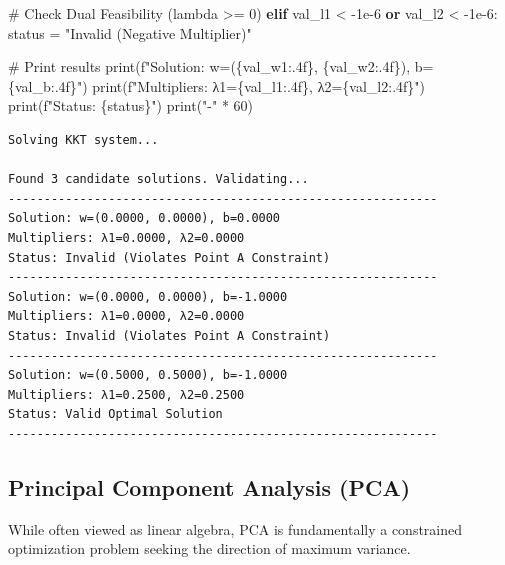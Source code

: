 \documentclass[
  letterpaper,
  DIV=11,
  numbers=noendperiod]{scrreprt}
\newenvironment{Shaded}{\begin{snugshade}}{\end{snugshade}}
\newcommand{\BuiltInTok}[1]{\textcolor[rgb]{0.00,0.23,0.31}{#1}}
\newcommand{\CommentTok}[1]{\textcolor[rgb]{0.37,0.37,0.37}{#1}}
\newcommand{\ControlFlowTok}[1]{\textcolor[rgb]{0.00,0.23,0.31}{\textbf{#1}}}
\newcommand{\DecValTok}[1]{\textcolor[rgb]{0.68,0.00,0.00}{#1}}
\newcommand{\FloatTok}[1]{\textcolor[rgb]{0.68,0.00,0.00}{#1}}
\newcommand{\KeywordTok}[1]{\textcolor[rgb]{0.00,0.23,0.31}{\textbf{#1}}}
\newcommand{\NormalTok}[1]{\textcolor[rgb]{0.00,0.23,0.31}{#1}}
\newcommand{\OperatorTok}[1]{\textcolor[rgb]{0.37,0.37,0.37}{#1}}
\newcommand{\SpecialCharTok}[1]{\textcolor[rgb]{0.37,0.37,0.37}{#1}}
\newcommand{\SpecialStringTok}[1]{\textcolor[rgb]{0.13,0.47,0.30}{#1}}
\newcommand{\StringTok}[1]{\textcolor[rgb]{0.13,0.47,0.30}{#1}}
\begin{document}
\begin{Shaded}
\begin{Highlighting}[]
    \CommentTok{\# Check Dual Feasibility (lambda \textgreater{}= 0)}
    \ControlFlowTok{elif}\NormalTok{ val\_l1 }\OperatorTok{\textless{}} \OperatorTok{{-}}\FloatTok{1e{-}6} \KeywordTok{or}\NormalTok{ val\_l2 }\OperatorTok{\textless{}} \OperatorTok{{-}}\FloatTok{1e{-}6}\NormalTok{:}
\NormalTok{        status }\OperatorTok{=} \StringTok{"Invalid (Negative Multiplier)"}

    \CommentTok{\# Print results}
    \BuiltInTok{print}\NormalTok{(}\SpecialStringTok{f"Solution: w=(}\SpecialCharTok{\{}\NormalTok{val\_w1}\SpecialCharTok{:.4f\}}\SpecialStringTok{, }\SpecialCharTok{\{}\NormalTok{val\_w2}\SpecialCharTok{:.4f\}}\SpecialStringTok{), b=}\SpecialCharTok{\{}\NormalTok{val\_b}\SpecialCharTok{:.4f\}}\SpecialStringTok{"}\NormalTok{)}
    \BuiltInTok{print}\NormalTok{(}\SpecialStringTok{f"Multipliers: λ1=}\SpecialCharTok{\{}\NormalTok{val\_l1}\SpecialCharTok{:.4f\}}\SpecialStringTok{, λ2=}\SpecialCharTok{\{}\NormalTok{val\_l2}\SpecialCharTok{:.4f\}}\SpecialStringTok{"}\NormalTok{)}
    \BuiltInTok{print}\NormalTok{(}\SpecialStringTok{f"Status: }\SpecialCharTok{\{}\NormalTok{status}\SpecialCharTok{\}}\SpecialStringTok{"}\NormalTok{)}
    \BuiltInTok{print}\NormalTok{(}\StringTok{"{-}"} \OperatorTok{*} \DecValTok{60}\NormalTok{)}
\end{Highlighting}
\end{Shaded}

\begin{verbatim}
Solving KKT system...

Found 3 candidate solutions. Validating...
------------------------------------------------------------
Solution: w=(0.0000, 0.0000), b=0.0000
Multipliers: λ1=0.0000, λ2=0.0000
Status: Invalid (Violates Point A Constraint)
------------------------------------------------------------
Solution: w=(0.0000, 0.0000), b=-1.0000
Multipliers: λ1=0.0000, λ2=0.0000
Status: Invalid (Violates Point A Constraint)
------------------------------------------------------------
Solution: w=(0.5000, 0.5000), b=-1.0000
Multipliers: λ1=0.2500, λ2=0.2500
Status: Valid Optimal Solution
------------------------------------------------------------
\end{verbatim}

\subsection{Principal Component Analysis
(PCA)}\label{principal-component-analysis-pca}

While often viewed as linear algebra, PCA is fundamentally a constrained
optimization problem seeking the direction of maximum variance.
\end{document}
